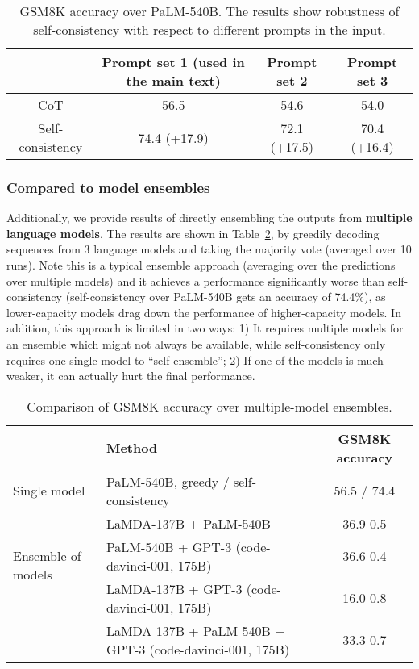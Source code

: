 \begin{table}[h]
\small
    \centering
    \begin{tabular}{c|c|c|c}
    \toprule
    & Prompt set 1 (used in the main text) & Prompt set 2 & Prompt set 3\\
    \midrule
        CoT \citep{wei2022chain} &  56.5 & 54.6 & 54.0 \\
        Self-consistency & 74.4 (+17.9) & 72.1 (+17.5) & 70.4 (+16.4)\\
        \bottomrule
    \end{tabular}
    \vspace{-0.1in}
    \caption{GSM8K accuracy over PaLM-540B. The results show robustness of self-consistency with respect to different prompts in the input.}
    \label{tab:robustness_prompt}
\end{table}


\subsubsection{Compared to model ensembles}
\label{sec:compare_ensemble}
Additionally, we provide results of directly ensembling the outputs from \textbf{multiple language models}. The results are shown in  Table~\ref{tab:ensemble_model}, by greedily decoding sequences from 3 language models and taking the majority vote (averaged over 10 runs). Note this is a typical ensemble approach (averaging over the predictions over multiple models) and it achieves a performance significantly worse than self-consistency (self-consistency over PaLM-540B gets an accuracy of 74.4\%), as lower-capacity models drag down the performance of higher-capacity models. In addition, this approach is limited in two ways:
1) It requires multiple models for an ensemble which might not always be available, while self-consistency only requires one single model to ``self-ensemble'';
2) If one of the models is much weaker, it can actually hurt the final performance.

\begin{table}[h]
\setlength\tabcolsep{3pt}
    \centering
\small
    \begin{tabular}{ll c}
    \toprule
    & Method & GSM8K accuracy\\
     \midrule
Single model & PaLM-540B, greedy / self-consistency & 56.5 / 74.4\\
\midrule
\multirow{3}{*}{Ensemble of models}  &  LaMDA-137B + PaLM-540B & 36.9  0.5 \\
& PaLM-540B + GPT-3 (code-davinci-001, 175B) &  36.6  0.4\\
& LaMDA-137B + GPT-3 (code-davinci-001, 175B) &16.0  0.8\\
& LaMDA-137B + PaLM-540B + GPT-3 (code-davinci-001, 175B) & 33.3  0.7\\
\bottomrule
    \end{tabular}
    \vspace{-0.1in}
    \caption{Comparison of GSM8K accuracy over multiple-model ensembles.}
    \label{tab:ensemble_model}
\end{table}

